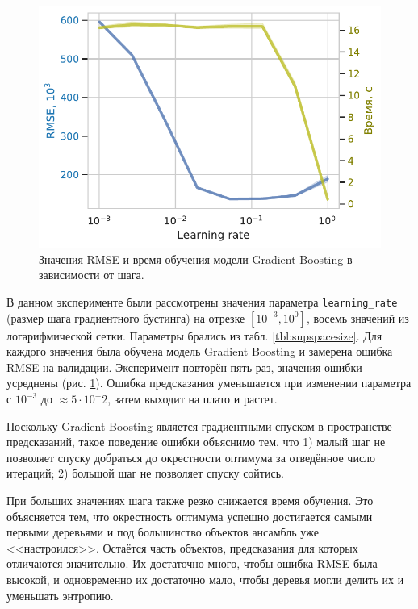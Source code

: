 \documentclass[12pt]{extarticle}
\begin{document}
\begin{figure}
    \vspace{-3mm}
    \includegraphics[width=1\linewidth]{pics/lr.pdf}
    \caption{Значения RMSE и время обучения модели Gradient Boosting в зависимости от шага.}
    \label{fig:lr}
    \centering
\end{figure}
В данном эксперименте были рассмотрены значения параметра \texttt{learning\_rate} (размер шага градиентного бустинга) на отрезке $[10^{-3}, 10^0]$, восемь значений из логарифмической сетки. Параметры брались из табл. \ref{tbl:supspacesize}. Для каждого значения была обучена модель Gradient Boosting и замерена ошибка RMSE на валидации. Эксперимент повторён пять раз, значения ошибки усреднены (рис. \ref{fig:lr}). Ошибка предсказания уменьшается при изменении параметра с $10^{-3}$ до $\approx5\cdot 10^-2$, затем выходит на плато и растет.

Поскольку Gradient Boosting является градиентными спуском в пространстве предсказаний, такое поведение ошибки объяснимо тем, что 1) малый шаг не позволяет спуску добраться до окрестности оптимума за отведённое число итераций; 2) большой шаг не позволяет спуску сойтись.

При больших значениях шага также резко снижается время обучения. Это объясняется тем, что окрестность оптимума успешно достигается самыми первыми деревьями и под большинство объектов ансамбль уже <<настроился>>. Остаётся часть объектов, предсказания для которых отличаются значительно. Их достаточно много, чтобы ошибка RMSE была высокой, и одновременно их достаточно мало, чтобы деревья могли делить их и уменьшать энтропию.
\end{document}
